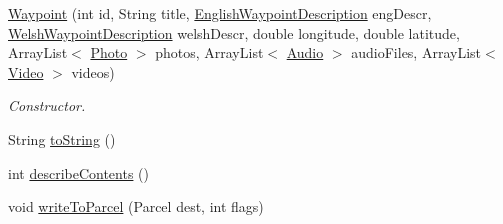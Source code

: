 \begin{DoxyCompactItemize}
\hyperlink{classuk_1_1ac_1_1swan_1_1digitaltrails_1_1components_1_1_waypoint_a665c0d2749a8aa79318f7b7e1f8c8b2d}{Waypoint} (int id, String title, \hyperlink{classuk_1_1ac_1_1swan_1_1digitaltrails_1_1components_1_1_english_waypoint_description}{English\+Waypoint\+Description} eng\+Descr, \hyperlink{classuk_1_1ac_1_1swan_1_1digitaltrails_1_1components_1_1_welsh_waypoint_description}{Welsh\+Waypoint\+Description} welsh\+Descr, double longitude, double latitude, Array\+List$<$ \hyperlink{classuk_1_1ac_1_1swan_1_1digitaltrails_1_1components_1_1_photo}{Photo} $>$ photos, Array\+List$<$ \hyperlink{classuk_1_1ac_1_1swan_1_1digitaltrails_1_1components_1_1_audio}{Audio} $>$ audio\+Files, Array\+List$<$ \hyperlink{classuk_1_1ac_1_1swan_1_1digitaltrails_1_1components_1_1_video}{Video} $>$ videos)
\begin{DoxyCompactList}\small\item\em Constructor. \end{DoxyCompactList}\item 
String \hyperlink{classuk_1_1ac_1_1swan_1_1digitaltrails_1_1components_1_1_waypoint_ac0e7d4601761a9ebc20941b07a713df3}{to\+String} ()
\item 
int \hyperlink{classuk_1_1ac_1_1swan_1_1digitaltrails_1_1components_1_1_waypoint_a6d7c30af946e5c62ca3fbdb1267d1cf4}{describe\+Contents} ()
\item 
void \hyperlink{classuk_1_1ac_1_1swan_1_1digitaltrails_1_1components_1_1_waypoint_a332c1112134a76443e580c87db456e28}{write\+To\+Parcel} (Parcel dest, int flags)
\end{DoxyCompactItemize}
